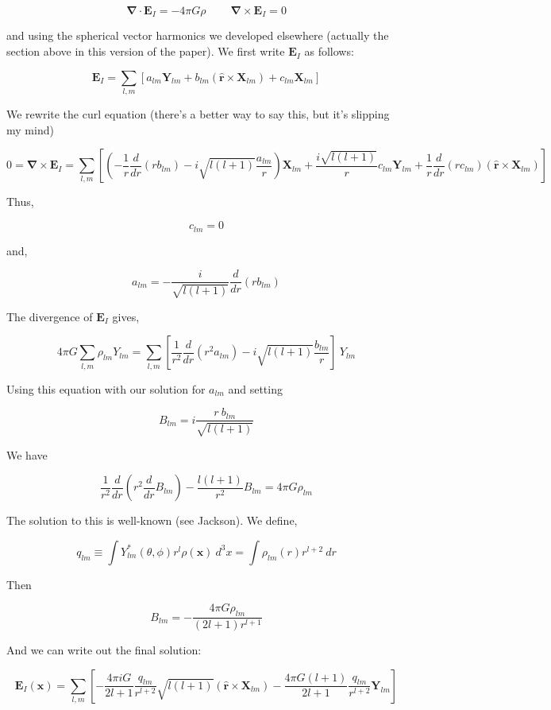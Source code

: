 \documentclass {article}
\renewcommand\vec{\mathbf}
\let\OldS\nabla
\renewcommand{\nabla}{\boldsymbol{\OldS}}
\let\OldHat\hat
\renewcommand{\hat}[1]{\OldHat{\mathbf{#1}}}
\begin{document}
$$\nabla \cdot \vec{E}_I = -4 \pi G \rho ~~~~~~~~~~ \nabla \times \vec{E}_I = 0$$

and using the spherical vector harmonics we developed elsewhere (actually the section above in this version of the paper).  We first write $\vec E_I $ as follows:

$$\vec E_I =  \sum_{l,m} \left[a_{lm}\vec Y_{lm} +b_{lm} (\hat r \times \vec X_{lm}) +c_{lm}\vec X_{lm} \right] $$

We rewrite the curl equation (there's a better way to say this, but it's slipping my mind)

$$ 0 = \nabla \times \vec E_I  = \sum_{l, m} \left[ \left( - \frac 1 r \frac d {dr} (r b_{lm}) - i \sqrt {l ( l +1)}  \frac {a_{lm} } r \right) \vec X_{lm} + \frac {i \sqrt {l(l+1)} } r c_{lm} \vec Y_{lm} + \frac 1 r \frac d {dr} (r c_{lm}) (\hat r \times \vec X_{lm}) \right] $$

Thus,

$$ c_{lm} = 0 $$

and,

$$a_{lm} = - \frac i {\sqrt{l(l+1)} }\frac d {dr} (r b_{lm}) $$

The divergence of $\vec E_I$ gives,

$$ 4 \pi G \sum_{l, m} \rho_{lm} Y_{lm} = \sum_{l, m} \left[ \frac 1 {r^2} \frac d {dr} (r^2 a_{lm} ) - i \sqrt{l(l+1)} \frac {b_{lm}} r  \right] ~ Y_{lm} $$

Using this equation with our solution for $a_{lm}$ and setting 

$$B_{lm} = i \frac {r ~ b_{lm}} {\sqrt {l (l+1)}} $$

We have

$$\frac 1 {r^2} \frac d {dr} \left( r^2 \frac d {dr} B_{lm} \right) - \frac {l(l+1)} {r^2} B_{lm} = 4 \pi G \rho_{lm}$$

The solution to this is well-known (see Jackson). We define,

$$q_{lm} \equiv \int Y_{lm}^* (\theta, \phi) r^l  \rho (\vec x) ~ d^3x = \int \rho_{lm} (r) r^{l+2} ~ dr $$

Then 

$$ B_{lm} = - \frac {4 \pi G \rho_{lm}} {(2l +1) r^{l+1}} $$ 
 

And we can write out the final solution:

$$\vec E_I(\vec x) = \sum_{l,m} \left[ -\frac {4\pi i G }{2l+1} \frac {q_{lm}}{r^{l+2}} \sqrt {l(l+1)} \left(\hat r \times \vec X_{lm} \right)  - \frac {4 \pi G (l+1)}{2l+1} \frac {q_{lm}}{r^{l+2}} \vec Y_{lm} \right] $$
\end{document}
